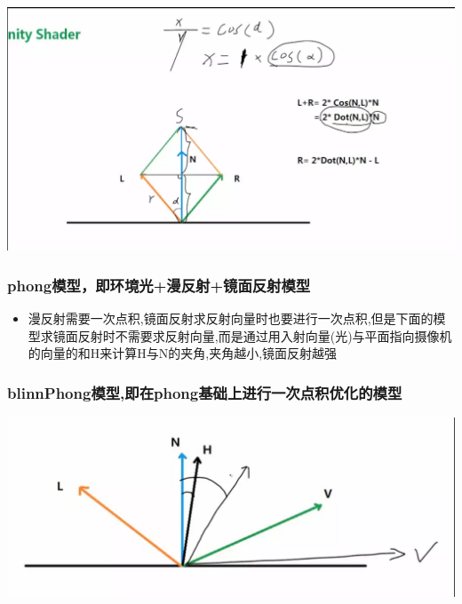 \documentclass[9pt, b5paper]{article}
\begin{document}
\includegraphics[width=.9\linewidth]{./pic/cosaNL2.png}
\subsubsection{phong模型，即环境光+漫反射+镜面反射模型}
\label{sec-3-2-2}
\begin{itemize}
\item 漫反射需要一次点积,镜面反射求反射向量时也要进行一次点积,但是下面的模型求镜面反射时不需要求反射向量,而是通过用入射向量(光)与平面指向摄像机的向量的和H来计算H与N的夹角,夹角越小,镜面反射越强
\end{itemize}
\subsubsection{blinnPhong模型,即在phong基础上进行一次点积优化的模型}
\label{sec-3-2-3}

\includegraphics[width=.9\linewidth]{./pic/blinnphong.png}
\end{document}
